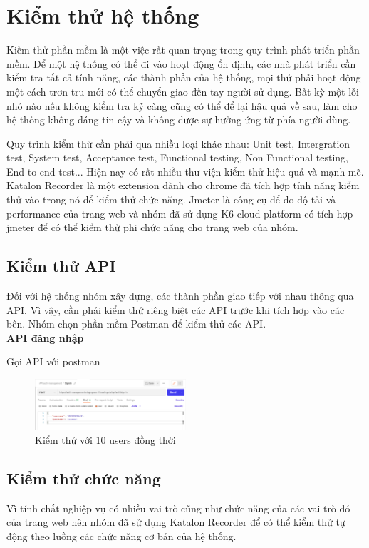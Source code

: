 \chapter{Kiểm thử hệ thống}\label{chap:testing}
		Kiếm thử phần mềm là một việc rất quan trọng trong quy trình phát triển phần mềm.
        Để một hệ thống có thể đi vào hoạt động ổn định, các nhà phát triển cần kiểm tra tất
        cả tính năng, các thành phần của hệ thống, mọi thứ phải hoạt động một cách trơn tru
        mới có thể chuyển giao đến tay người sử dụng. Bất kỳ một lỗi nhỏ nào nếu không kiểm
        tra kỹ càng cũng có thể để lại hậu quả về sau, làm cho hệ thống không đáng tin cậy và
        không được sự hưởng ứng từ phía người dùng.
        
        Quy trình kiểm thử cần phải qua nhiều loại khác nhau: Unit test, Intergration test, System test, Acceptance test, Functional testing, Non Functional testing, End to end test... Hiện nay có rất nhiều thư viện kiểm thử hiệu quả và mạnh mẽ. Katalon Recorder là một extension dành cho chrome đã tích hợp tính năng kiểm thử vào trong nó để kiểm thử chức năng. Jmeter là công cụ để đo độ tải và performance của trang web và nhóm đã sử dụng K6 cloud platform có tích hợp jmeter để có thể kiểm thử phi chức năng cho trang web của nhóm.
		\section{Kiểm thử API}
		Đối với hệ thống nhóm xây dựng, các thành phần giao tiếp với nhau thông qua API. Vì vậy, cần phải kiểm thử riêng biệt các API trước khi tích hợp vào các bên. Nhóm chọn phần mềm Postman để kiểm thử các API.\\
		
		\textbf{API đăng nhập}
		
		Gọi API với postman
		
		\begin{figure}[!ht]
			\includegraphics[width=0.5\textwidth]{Images/postman/api_sign_in.png}
			\centering
			\linebreak
			\caption{Kiểm thử với 10 users đồng thời}
		\end{figure}
		
		\section{Kiểm thử chức năng}
		    Vì tính chất nghiệp vụ có nhiều vai trò cũng như chức năng của các vai trò đó của trang web nên nhóm đã sử dụng Katalon Recorder để có thể kiểm thử tự động theo luồng các chức năng cơ bản của hệ thống.
			

